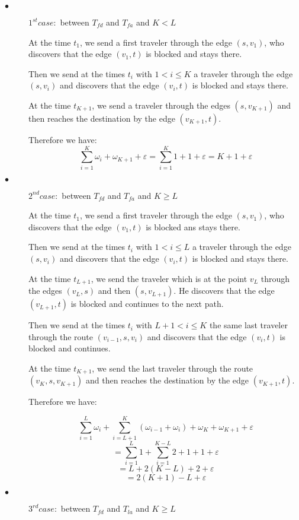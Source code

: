 \documentclass[a4paper, 10pt]{article}
\begin{document}
\begin{description}
\item[$\bullet$] $1^{st} case:$ between $T_{fd}$ and $T_{fa}$ and $K<L$

At the time $t_1$, we send a first traveler through the edge $(s,v_1)$, who discovers that the edge $(v_1,t)$ is blocked and stays there.

Then we send at the times $t_i$ with $1 < i \leq K$ a traveler through the edge $(s,v_i)$ and discovers that the edge $(v_i,t)$ is blocked and stays there.

At the time $t_{K+1}$, we send a traveler through the edges $(s,v_{K+1})$ and then reaches the destination by the edge $(v_{K+1},t)$. 

Therefore we have: 
\[
\sum_{i=1}^{K} \omega_{i} + \omega_{K+1} + \varepsilon = \sum_{i=1}^{K} 1 + 1 + \varepsilon = K + 1 + \varepsilon
\]

\item[$\bullet$] $2^{nd} case:$ between $T_{fd}$ and $T_{fa}$ and $K \geq L$

At the time $t_1$, we send a first traveler through the edge $(s,v_1)$, who discovers that the edge $(v_1,t)$ is blocked ans stays there.

Then we send at the times $t_i$ with $1 < i \leq L$ a traveler through the edge $(s,v_i)$ and discovers that the edge $(v_i,t)$ is blocked and stays there.

At the time $t_{L+1}$, we send the traveler which is at the point $v_L$ through the edges $(v_{L},s)$ and then $(s,v_{L+1})$. He discovers that the edge $(v_{L+1},t)$ is blocked and continues to the next path.

Then we send at the times $t_i$ with $L+1 < i \leq K$ the same last traveler through the route $(v_{i-1},s,v_i)$ and discovers that the edge $(v_i,t)$ is blocked and continues.

At the time $t_{K+1}$, we send the last traveler through the route $(v_K,s,v_{K+1})$ and then reaches the destination by the edge $(v_{K+1},t)$. 

Therefore we have: 

\[
\sum_{i=1}^{L} \omega_{i} + \sum_{i=L+1}^{K}(\omega_{i-1} + \omega_{i} ) + \omega_{K} + \omega_{K+1} + \varepsilon
\]
\[
=\sum_{i=1}^{L} 1 + \sum_{i=1}^{K-L}2 + 1 + 1 + \varepsilon
\]
\[
= L + 2(K - L) + 2 + \varepsilon
\]
\[
= 2(K + 1 ) - L + \varepsilon
\]

\item[$\bullet$] $3^{rd} case:$ between $T_{fd}$ and $T_{la}$ and $K \geq L$


\end{description}
\end{document}
